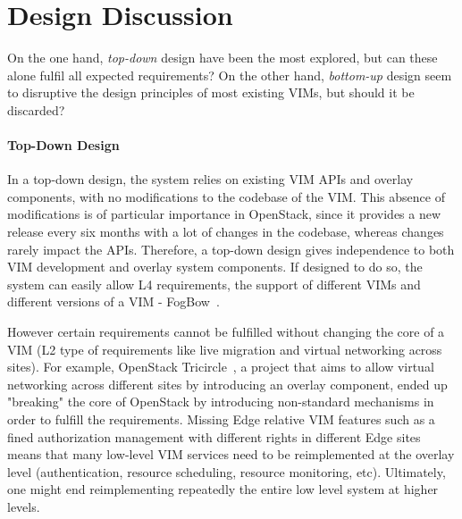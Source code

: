 


\section{Design Discussion}
\label{sec:design_discussion}
On the one hand, \emph{top-down} design have been the most explored, but can these alone fulfil all expected requirements? On the other hand, \emph{bottom-up} design seem to disruptive the design principles of most existing VIMs, but should it be discarded?

\paragraph{Top-Down Design}
In a top-down design, the system relies on existing VIM APIs and
overlay components, with no modifications to the codebase of the VIM.
This absence of modifications is of particular importance in
OpenStack, since it provides a new release every six months with a lot
of changes in the codebase, whereas changes rarely impact the APIs.
Therefore, a top-down design gives independence to both VIM
development and overlay system components. If designed to do so, the
system can easily allow L4 requirements, \ie the support of different
VIMs and different versions of a VIM - \eg
FogBow~\cite{brasileiro2016fogbow}.

However certain requirements cannot be fulfilled without changing the
core of a VIM (\eg L2 type of requirements like live migration and
virtual networking across sites). For example, OpenStack
Tricircle~\cite{tricircle}, a project that aims to allow virtual
networking across different sites by introducing an overlay component,
ended up "breaking" the core of OpenStack by introducing non-standard
mechanisms in order to fulfill the requirements. Missing Edge relative
VIM features such as a fined authorization management with different
rights in different Edge sites means that many low-level VIM services
need to be reimplemented at the overlay level (\eg authentication,
resource scheduling, resource monitoring, etc). Ultimately, one might
end reimplementing repeatedly the entire low level system at higher
levels.




